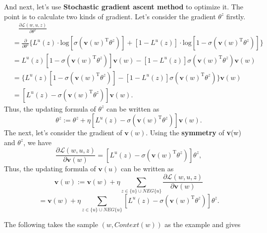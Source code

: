 And next, let's use \textbf{Stochastic gradient ascent method} to optimize it. The point is to calculate two kinds of gradient. Let's consider the gradient $\theta^z$ firstly.
\begin{align*}
& \ \ \ \ \frac{\partial\mathcal{L}(w,u,z)}{\partial\theta^z} \\
& =  \frac{\partial}{\partial\theta^z} \{ L^u(z)\cdot \mathrm{log}[\sigma(\mathbf{v}(w)^{\mathrm{T}}\theta^z)]+[1-L^u(z)]\cdot\mathrm{log}[1-\sigma(\mathbf{v}(w)^{\mathrm{T}}\theta^z)] \} \\
& =  L^u(z)[1-\sigma(\mathbf{v}(w)^{\mathrm{T}}\theta^z)]\mathbf{v}(w) - [1-L^u(z)]\sigma(\mathbf{v}(w)^{\mathrm{T}}\theta^z)\mathbf{v}(w) \\
& = \{L^u(z)[1-\sigma(\mathbf{v}(w)^{\mathrm{T}}\theta^z)]-[1-L^u(z)]\sigma(\mathbf{v}(w)^{\mathrm{T}}\theta^z)\}\mathbf{v}(w) \\
& = [L^u(z)-\sigma(\mathbf{v}(w)^{\mathrm{T}}\theta^z)] \mathbf{v}(w).
\end{align*}
Thus, the updating formula of $\theta^z$ can be written as
$$\theta^z:=\theta^z+\eta[L^u(z)-\sigma(\mathbf{v}(w)^{\mathrm{T}}\theta^z)]\mathbf{v}(w).$$
The next, let's consider the gradient of $\mathbf{v}(w)$. Using the \textbf{symmetry} of \textbf{v}(w) and $\theta^z$, we have
$$\frac{\partial\mathcal{L}(w,u,z)}{\partial\mathbf{v}(w)} = [L^u(z)-\sigma(\mathbf{v}(w)^{\mathrm{T}}\theta^z)]\theta^z,$$
Thus, the updating formula of $\mathbf{v}(u)$ can be written as 
$$\mathbf{v}(w):=\mathbf{v}(w)+\eta\sum_{z\in\{u\}\cup NEG\{u\}}\frac{\partial\mathcal{L}(w,u,z)}{\partial\mathbf{v}(w)}$$
$$=\mathbf{v}(w)+\eta\sum_{z\in\{u\}\cup NEG\{u\}}[L^u(z)-\sigma(\mathbf{v}(w)^{\mathrm{T}}\theta^z)]\theta^z.$$

The following takes the sample $(w,Context(w))$ as the example and gives 




